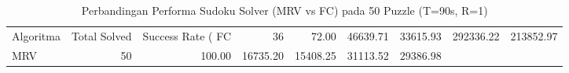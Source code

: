 \begin{table}
\caption{Perbandingan Performa Sudoku Solver (MRV vs FC) pada 50 Puzzle (T=90s, R=1)}
\label{tab:sudoku_summary}
\begin{tabular}{lrrrrrr}
\toprule
Algoritma & Total Solved & Success Rate (%
\midrule
FC & 36 & 72.00 & 46639.71 & 33615.93 & 292336.22 & 213852.97 \\
MRV & 50 & 100.00 & 16735.20 & 15408.25 & 31113.52 & 29386.98 \\
\bottomrule
\end{tabular}
\end{table}
